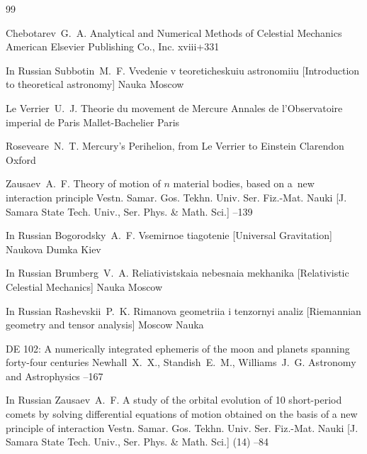 \begin{thebibliography}{99}

\by Chebotarev~G.~A.
\book Analytical and Numerical Methods of Celestial Mechanics
\publ American Elsevier Publishing Co., Inc.
\totalpages xviii+331 


\lang In Russian
\by Subbotin~M.~F.
\book Vvedenie v teoreticheskuiu astronomiiu \rm [Introduction to theoretical astronomy]
\publ Nauka
\publaddr Moscow
 

\by Le Verrier~U.~J.
\book Theorie du movement de Mercure
\serial Annales de l'Observatoire imperial de Paris 
\publ Mallet-Bachelier
\publaddr Paris

\by Roseveare~N.~T.
\book Mercury's Perihelion, from Le Verrier to Einstein
\publ Clarendon
\publaddr Oxford

\by Zausaev~A.~F.
\paper Theory of motion of $n$ material bodies, based on a~new interaction principle
\jour Vestn. Samar. Gos. Tekhn. Univ. Ser. Fiz.-Mat. Nauki \rm [J. Samara State Tech. Univ., Ser. Phys. \& Math. Sci.]
--139


\lang In Russian
\by Bogorodsky~A.~F.
\book Vsemirnoe tiagotenie \rm [Universal Gravitation]
\publ Naukova Dumka
\publaddr Kiev

\lang In Russian
\by Brumberg~V.~A.
\book Reliativistskaia nebesnaia mekhanika \rm [Relativistic Celestial Mechanics]
\publ Nauka
\publaddr Moscow

\lang In Russian
\by Rashevskii~P.~K.
\book Rimanova geometriia i tenzornyi analiz \rm [Riemannian geometry and tensor analysis]
\publaddr Moscow
\publ Nauka


\paper DE 102: A numerically integrated ephemeris of the moon and planets spanning forty-four centuries
\by Newhall~X.~X., Standish~E.~M., Williams~J.~G.
\jour  Astronomy and Astrophysics 
--167


\lang In Russian
\by Zausaev~A.~F.
\paper A study of the orbital evolution of 10 short-period comets by solving differential equations of motion obtained on the basis of a new principle of interaction
\jour Vestn. Samar. Gos. Tekhn. Univ. Ser. Fiz.-Mat. Nauki \rm [J. Samara State Tech. Univ., Ser. Phys. \& Math. Sci.]
(14)
--84


\end{thebibliography}

